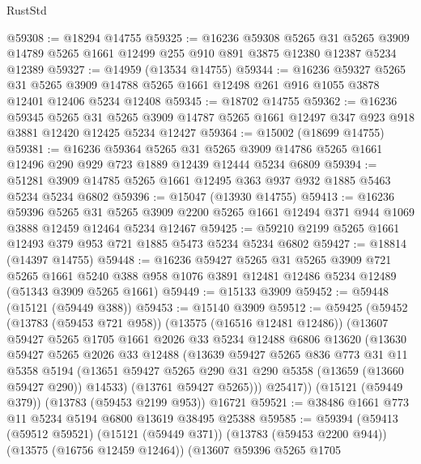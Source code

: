 \begin{lexlean}{RustStd}
\begin{coremodule}
@59308 := @18294 @14755
@59325 := @16236
    @59308
    @5265
    @31
    @5265
    @3909
    @14789
    @5265
    @1661
    @12499
    @255
    @910
    @891
    @3875
    @12380
    @12387
    @5234
    @12389
@59327 := @14959 (@13534 @14755)
@59344 := @16236
    @59327
    @5265
    @31
    @5265
    @3909
    @14788
    @5265
    @1661
    @12498
    @261
    @916
    @1055
    @3878
    @12401
    @12406
    @5234
    @12408
@59345 := @18702 @14755
@59362 := @16236
    @59345
    @5265
    @31
    @5265
    @3909
    @14787
    @5265
    @1661
    @12497
    @347
    @923
    @918
    @3881
    @12420
    @12425
    @5234
    @12427
@59364 := @15002 (@18699 @14755)
@59381 := @16236
    @59364
    @5265
    @31
    @5265
    @3909
    @14786
    @5265
    @1661
    @12496
    @290
    @929
    @723
    @1889
    @12439
    @12444
    @5234
    @6809
@59394 := @51281 @3909 @14785 @5265 @1661 @12495 @363 @937 @932 @1885 @5463 @5234 @5234 @6802
@59396 := @15047 (@13930 @14755)
@59413 := @16236
    @59396
    @5265
    @31
    @5265
    @3909
    @2200
    @5265
    @1661
    @12494
    @371
    @944
    @1069
    @3888
    @12459
    @12464
    @5234
    @12467
@59425 := @59210 @2199 @5265 @1661 @12493 @379 @953 @721 @1885 @5473 @5234 @5234 @6802
@59427 := @18814 (@14397 @14755)
@59448 := @16236
    @59427
    @5265
    @31
    @5265
    @3909
    @721
    @5265
    @1661
    @5240
    @388
    @958
    @1076
    @3891
    @12481
    @12486
    @5234
    @12489
    (@51343 @3909 @5265 @1661)
@59449 := @15133 @3909
@59452 := @59448 (@15121 (@59449 @388))
@59453 := @15140 @3909
@59512 := @59425
    (@59452
      (@13783 (@59453 @721 @958))
      (@13575 (@16516 @12481 @12486))
      (@13607
        @59427
        @5265
        @1705
        @1661
        @2026
        @33
        @5234
        @12488
        @6806
        @13620
        (@13630
          @59427
          @5265
          @2026
          @33
          @12488
          (@13639
            @59427
            @5265
            @836
            @773
            @31
            @11
            @5358
            @5194
            (@13651 @59427 @5265 @290 @31 @290 @5358 (@13659 (@13660 @59427 @290)) @14533)
            (@13761 @59427 @5265)))
        @25417))
    (@15121 (@59449 @379))
    (@13783 (@59453 @2199 @953))
    @16721
@59521 := @38486 @1661 @773 @11 @5234 @5194 @6800 @13619 @38495 @25388
@59585 := @59394
    (@59413
      (@59512 @59521)
      (@15121 (@59449 @371))
      (@13783 (@59453 @2200 @944))
      (@13575 (@16756 @12459 @12464))
      (@13607
        @59396
        @5265
        @1705

\end{coremodule}
\end{lexlean}
